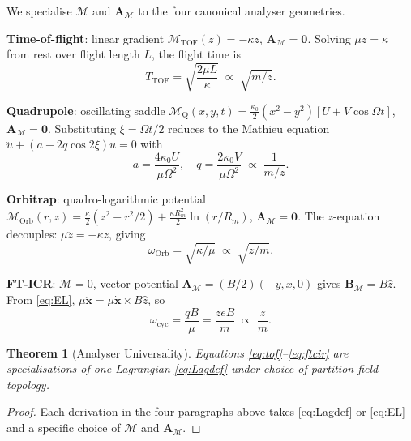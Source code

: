 \documentclass[twocolumn,10pt,a4paper]{article}
\theoremstyle{thmstyle}
\newtheorem{theorem}{Theorem}[section]
\theoremstyle{definition}
\theoremstyle{remark}
\newcommand{\Depth}{\mathcal{M}}
\newcommand{\Apartition}{\mathbf{A}_{\Depth}}
\newcommand{\partinert}{\mu}
\begin{document}
We specialise $\Depth$ and $\Apartition$ to the four canonical
analyser geometries.

\textbf{Time-of-flight}: linear gradient
$\Depth_{\mathrm{TOF}}(z)=-\kappa z$, $\Apartition=\mathbf{0}$.
Solving $\partinert\ddot{z}=\kappa$ from rest over flight length $L$,
the flight time is
\begin{equation}
T_{\mathrm{TOF}}=\sqrt{\frac{2\partinert L}{\kappa}}
\;\propto\;\sqrt{m/z}.
\label{eq:tof}
\end{equation}

\textbf{Quadrupole}: oscillating saddle
$\Depth_{\mathrm{Q}}(x,y,t)=\tfrac{\kappa_{0}}{2}(x^{2}-y^{2})[U+V\cos\Omega t]$,
$\Apartition=\mathbf{0}$. Substituting $\xi=\Omega t/2$ reduces to
the Mathieu equation $\ddot u+(a-2q\cos 2\xi)u=0$ with
\begin{equation}
a=\frac{4\kappa_{0}U}{\partinert\Omega^{2}},\quad
q=\frac{2\kappa_{0}V}{\partinert\Omega^{2}}\;\propto\;\frac{1}{m/z}.
\label{eq:mathieu}
\end{equation}

\textbf{Orbitrap}: quadro-logarithmic potential
$\Depth_{\mathrm{Orb}}(r,z)=\tfrac{\kappa}{2}(z^{2}-r^{2}/2)
+\tfrac{\kappa R_{m}^{2}}{2}\ln(r/R_{m})$, $\Apartition=\mathbf{0}$.
The $z$-equation decouples:
$\partinert\ddot z=-\kappa z$, giving
\begin{equation}
\omega_{\mathrm{Orb}}=\sqrt{\kappa/\partinert}
\;\propto\;\sqrt{z/m}.
\label{eq:orb}
\end{equation}

\textbf{FT-ICR}: $\Depth=0$, vector potential
$\Apartition=(B/2)(-y,x,0)$ gives $\mathbf{B}_{\Depth}=B\hat z$. From
\eqref{eq:EL}, $\partinert\ddot{\mathbf{x}}=
\partinert\dot{\mathbf{x}}\times B\hat z$, so
\begin{equation}
\omega_{\mathrm{cyc}}=\frac{qB}{\partinert}=\frac{zeB}{m}
\;\propto\;\frac{z}{m}.
\label{eq:ftcir}
\end{equation}

\begin{theorem}[Analyser Universality]
\label{thm:univ}
Equations \eqref{eq:tof}--\eqref{eq:ftcir} are specialisations of one
Lagrangian \eqref{eq:Lagdef} under choice of partition-field topology.
\end{theorem}

\begin{proof}
Each derivation in the four paragraphs above takes \eqref{eq:Lagdef}
or \eqref{eq:EL} and a specific choice of $\Depth$ and $\Apartition$.
\end{proof}
\end{document}
